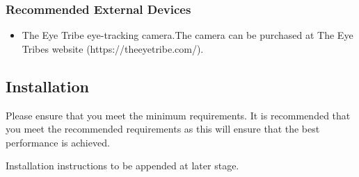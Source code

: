\subsubsection{Recommended External Devices}
\begin{itemize}
\item The Eye Tribe eye-tracking camera.The camera can be purchased at The Eye Tribes website (https://theeyetribe.com/).
\end{itemize}




\subsection{Installation}
Please ensure that you meet the minimum requirements. It is recommended that you meet the recommended requirements as this will ensure that the best performance is achieved.

Installation instructions to be appended at later stage.